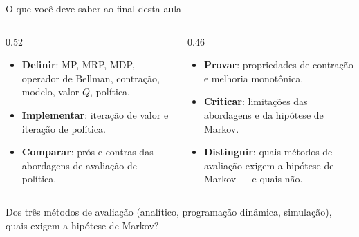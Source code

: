 \documentclass[aspectratio=169, 11pt]{beamer}
\begin{document}
\begin{frame}{O que você deve saber ao final desta aula}
  \begin{columns}[T]
    \begin{column}{0.52\textwidth}
      {\small
      \begin{itemize}\setlength{\itemsep}{0.5ex}
        \item \textbf{Definir}: MP, MRP, MDP, operador de Bellman, contração, modelo,
              valor $Q$, política.
        \item \textbf{Implementar}: iteração de valor e iteração de política.
        \item \textbf{Comparar}: prós e contras das abordagens de avaliação de política.
      \end{itemize}}
    \end{column}
    \begin{column}{0.46\textwidth}
      {\small
      \begin{itemize}\setlength{\itemsep}{0.5ex}
        \item \textbf{Provar}: propriedades de contração e melhoria monotônica.
        \item \textbf{Criticar}: limitações das abordagens e da hipótese de Markov.
        \item \textbf{Distinguir}: quais métodos de avaliação exigem a hipótese de
              Markov --- e quais não.
      \end{itemize}}
    \end{column}
  \end{columns}
  \vspace{0.4em}
  \begin{alertabox}
    Dos três métodos de avaliação (analítico, programação dinâmica, simulação), quais exigem a hipótese de Markov?
  \end{alertabox}
\end{frame}

\begin{frame}
\end{frame}
\end{document}
